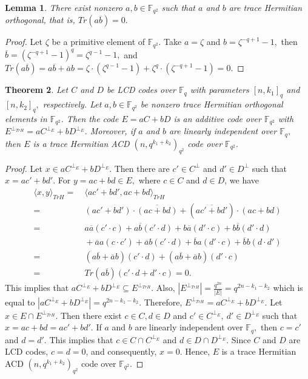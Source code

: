 \documentclass[sn-mathphys-num]{sn-jnl}%
\theoremstyle{thmstyleone}%
\newtheorem{theorem}{Theorem}%
\newtheorem{lemma}[theorem]{Lemma}
\theoremstyle{thmstyletwo}%
\theoremstyle{thmstylethree}%
\begin{document}
\begin{lemma}
	There exist nonzero $a,b\in \mathbb{F}_{q^2}$ such that $a$ and $b$ are trace Hermitian orthogonal, that is, $Tr(a\overline{b})=0.$
\end{lemma}
\begin{proof}
	Let $\zeta$ be a primitive element of $\mathbb{F}_{q^2}$. Take $a=\zeta$ and $b=\zeta^{-q+1}-1,$ then $\overline{b}=(\zeta^{-q+1}-1)^q=\zeta^{q-1}-1,$ and $Tr(a\overline{b})=a\overline{b}+\overline{a}b=\zeta \cdot (\zeta^{q-1}-1)+ \zeta^q\cdot (\zeta^{-q+1}-1)=0.$ 
\end{proof}
\begin{theorem}\label{abcdh}
	Let $C$ and $D$ be LCD codes over $\mathbb{F}_q$ with parameters $[n,k_1]_{q}$ and $[n,k_2]_{q},$ respectively. Let $ a,b\in \mathbb{F}_{q^2}$ be nonzero trace Hermitian orthogonal elements in $\mathbb{F}_{q^2}$. Then the code $E=aC+bD$ is an additive code over  $\mathbb{F}_{q^2}$ with $E^{\perp_{TrH}}=aC^{\perp_E}+bD^{\perp_E}$. Moreover, if $a$ and $b$ are linearly
	independent over $\mathbb{F}_q,$ then $E$ is a trace Hermitian ACD $(n,q^{k_1+k_2})_{q^2}$ code over $\mathbb{F}_{q^2}.$
\end{theorem}
\begin{proof}
	Let $x\in aC^{\perp_E}+bD^{\perp_E} .$ Then there are $c'\in C^{\perp}$ and $d'\in D^{\perp}$ such that $x=ac'+bd'.$ For $y=ac+bd\in E,$ where $c\in C$ and $d\in D$, we have
	\begin{align*}
		\langle x,y\rangle_{TrH}=&\ \langle ac'+bd',ac+bd\rangle_{TrH}\\
		=&\ (ac'+bd')\cdot \overline{(ac+bd)}+(\overline{ac'+bd'})\cdot (ac+bd)\\
		=&\  a\overline{a}(c'\cdot c)+a\overline{b}(c'\cdot d)+b\overline{a}(d'\cdot c)+b\overline{b}(d'\cdot d) \\
		&\ +\overline{a}a(c\cdot c')+\overline{a}b(c'\cdot d)+\overline{b}a(d'\cdot c)+\overline{b}b(d\cdot d')\\
		=&\ (a\overline{b}+\overline{a}b)(c'\cdot d)+(a\overline{b}+\overline{a}b)(d'\cdot c)\\
		=&\ Tr(a\overline{b})(c'\cdot d+d'\cdot c) =0.
	\end{align*}
	This implies that $aC^{\perp_E}+bD^{\perp_E} \subseteq E^{\perp_{TrH}}.$ Also, $|E^{\perp_{TrH}}|=\frac{q^{2n}}{|E|}=q^{2n-k_1-k_2}$ which is equal to $|aC^{\perp_E}+bD^{\perp_E}|=q^{2n-k_1-k_2}.$ Therefore, $E^{\perp_{TrH}}=aC^{\perp_E}+bD^{\perp_E}.$ Let $x\in E\cap E^{\perp_{TrH}}$. Then there exist $c\in C, d\in D$ and $c'\in C^{\perp_{E}},\ d'\in D^{\perp_{E}}$ such that $x=ac+bd=ac'+bd'. $ If $a$ and $b$ are linearly independent over $\mathbb{F}_q,$ then $c=c'$ and $d=d'.$ This implies that $c\in C\cap C^{\perp_E}$ and $d\in D\cap D^{\perp_E}.$ Since $C$  and $D$ are LCD codes, $c=d=0$, and consequently, $x=0.$ Hence, $E$ is a trace Hermitian ACD  $(n,q^{k_1+k_2})_{q^2} $ code over $\mathbb{F}_{q^2}.$
\end{proof}
\end{document}

